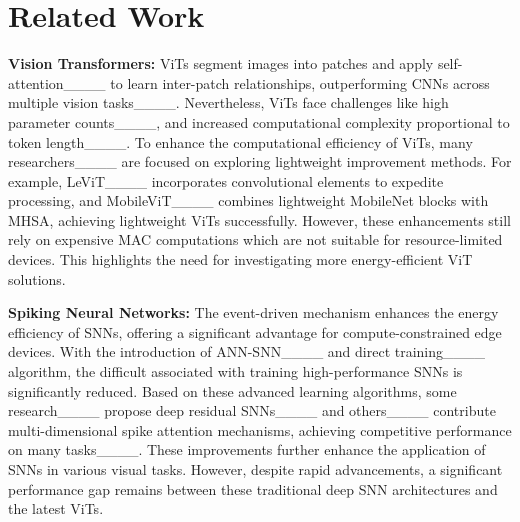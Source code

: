 \section{Related Work}
\textbf{Vision Transformers:} ViTs segment images into patches and apply self-attention____ to learn inter-patch relationships, outperforming CNNs across multiple vision tasks____. Nevertheless, ViTs face challenges like high parameter counts____, and increased computational complexity proportional to token length____. 
To enhance the computational efficiency of ViTs, many researchers____ are focused on exploring lightweight improvement methods. For example, LeViT____ incorporates convolutional elements to expedite processing, and MobileViT____ combines lightweight MobileNet blocks with MHSA, achieving lightweight ViTs successfully. However, these enhancements still rely on expensive MAC computations which are not suitable for resource-limited devices. This highlights the need for investigating more energy-efficient ViT solutions.

\textbf{Spiking Neural Networks:} The event-driven mechanism enhances the energy efficiency of SNNs, offering a significant advantage for compute-constrained edge devices. With the introduction of ANN-SNN____ and direct training____ algorithm, the difficult associated with training high-performance SNNs is significantly reduced.
Based on these advanced learning algorithms, some research____ propose deep residual SNNs____ and others____ contribute multi-dimensional spike attention mechanisms, achieving competitive performance on many tasks____. 
These improvements further enhance the application of SNNs in various visual tasks. However, despite rapid advancements, a significant performance gap remains between these traditional deep SNN architectures and the latest ViTs.

